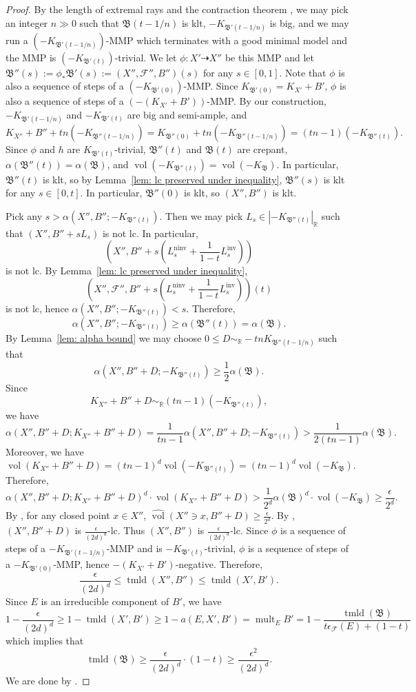 \documentclass[11pt,reqno]{amsart}
\numberwithin{equation}{section}
\newcommand{\vol}{\operatorname{vol}}
\newcommand{\nvol}{\widehat{\operatorname{vol}}}
\newcommand{\ninv}{\operatorname{ninv}}
\newcommand{\inv}{\operatorname{inv}}
\newcommand{\tmld}{{\operatorname{tmld}}}
\newcommand{\mult}{\operatorname{mult}}
\newcommand{\Bb}{{\mathfrak{B}}}
\newcommand{\Ff}{\mathcal{F}}
\theoremstyle{definition}
\begin{document}
\begin{proof}
By the length of extremal rays \cite[Theorem~1.3(2)]{Cas+24} and the contraction theorem \cite[Theorem~2.1.3]{Cas+25a}, we may pick an integer $n\gg 0$ such that $\Bb(t-1/n)$ is klt, $-K_{\Bb'(t-1/n)}$ is big, and we may run a $\left(-K_{\Bb'(t-1/n)}\right)$-MMP which terminates with a good minimal model and the MMP is $\left(-K_{\Bb'(t)}\right)$-trivial. We let $\phi\colon X'\dashrightarrow X''$ be this MMP and let $\Bb''(s):=\phi_*\Bb'(s):=(X'',\Ff'',B'')(s)$ for any $s\in [0,1]$. Note that $\phi$ is also a sequence of steps of a $(-K_{\Bb'(0)})$-MMP. Since $K_{\Bb'(0)}=K_{X'}+B'$, $\phi$ is also a sequence of steps of a $\left(-(K_{X'}+B')\right)$-MMP. By our construction, $-K_{\Bb'(t-1/n)}$ and $-K_{\Bb'(t)}$ are big and semi-ample, and
$$K_{X''}+B''+tn\left(-K_{\Bb''(t-1/n)}\right)=K_{\Bb''(0)}+tn\left(-K_{\Bb''(t-1/n)}\right)=(tn-1)(-K_{\Bb''(t)}).$$
Since $\phi$ and $h$ are $K_{\Bb'(t)}$-trivial, $\Bb''(t)$ and $\Bb(t)$ are crepant, $\alpha(\Bb''(t))=\alpha(\Bb)$, and $\vol(-K_{\Bb''(t)})=\vol(-K_{\Bb})$. In particular, $\Bb''(t)$ is klt, so by Lemma~\ref{lem: lc preserved under inequality}, $\Bb''(s)$ is klt for any $s\in [0,t]$. In particular, $\Bb''(0)$ is klt, so $(X'',B'')$ is klt. 

Pick any $s>\alpha(X'',B'';-K_{\Bb''(t)})$. Then we may pick $L_s\in |-K_{\Bb''(t)}|_{\mathbb R}$ such that $(X'',B''+sL_s)$ is not lc. In particular,
$$\left(X'',B''+s\left(L_s^{\ninv}+\frac{1}{1-t}L_s^{\inv}\right)\right)$$
is not lc. By Lemma~\ref{lem: lc preserved under inequality}, 
$$\left(X'',\Ff'',B''+s\left(L_s^{\ninv}+\frac{1}{1-t}L_s^{\inv}\right)\right)(t)$$
is not lc, hence $\alpha(X'',B'';-K_{\Bb''(t)})<s$. Therefore, 
$$\alpha(X'',B'';-K_{\Bb''(t)})\geq\alpha(\Bb''(t))=\alpha(\Bb).$$
By Lemma~\ref{lem: alpha bound} we may choose $0\leq D\sim_{\mathbb R}-tnK_{\Bb''(t-1/n)}$ such that 
$$\alpha(X'',B''+D;-K_{\Bb''(t)})\geq\frac{1}{2}\alpha(\Bb).$$ 
Since
$$K_{X''}+B''+D\sim_{\mathbb R}(tn-1)(-K_{\Bb''(t)}),$$
we have
$$\alpha(X'',B''+D;K_{X''}+B''+D)=\frac{1}{tn-1}\alpha(X'',B''+D;-K_{\Bb''(t)})>\frac{1}{2(tn-1)}\alpha(\Bb).$$
Moreover, we have
$$\vol(K_{X''}+B''+D)=(tn-1)^d\vol(-K_{\Bb''(t)})=(tn-1)^d\vol(-K_{\Bb}).$$
Therefore,
$$\alpha(X'',B''+D;K_{X''}+B''+D)^d\cdot\vol(K_{X''}+B''+D)>\frac{1}{2^d}\alpha(\Bb)^d\cdot\vol(-K_{\Bb})\geq\frac{\epsilon}{2^d}.$$
By \cite[Lemma~2.13]{XZ24}, for any closed point $x\in X''$, $\nvol(X''\ni x,B''+D)\geq\frac{\epsilon}{2^d}$. By \cite[Theorem~6.13]{LLX20}, $(X'',B''+D)$ is $\frac{\epsilon}{(2d)^d}$-lc. Thus $(X'',B'')$ is $\frac{\epsilon}{(2d)^d}$-lc. Since $\phi$ is a sequence of steps of a $-K_{\Bb'(t-1/n)}$-MMP and is $-K_{\Bb'(t)}$-trivial, $\phi$ is a sequence of steps of a $-K_{\Bb'(0)}$-MMP, hence $-(K_{X'}+B')$-negative. Therefore,
$$\frac{\epsilon}{(2d)^d}\leq \tmld(X'',B'')\leq\tmld(X',B').$$
Since $E$ is an irreducible component of $B'$, we have
$$1-\frac{\epsilon}{(2d)^d}\geq1-\tmld(X',B')\geq 1-a(E,X',B')=\mult_EB'=1-\frac{\tmld(\Bb)}{t\epsilon_{\Ff}(E)+(1-t)}$$
which implies that
$$\tmld(\Bb)\geq\frac{\epsilon}{(2d)^d}\cdot (1-t)\geq\frac{\epsilon^2}{(2d)^d}.$$
We are done by \cite[Theorem~2.4.1]{Cas+25a}.
\end{proof}
\end{document}
